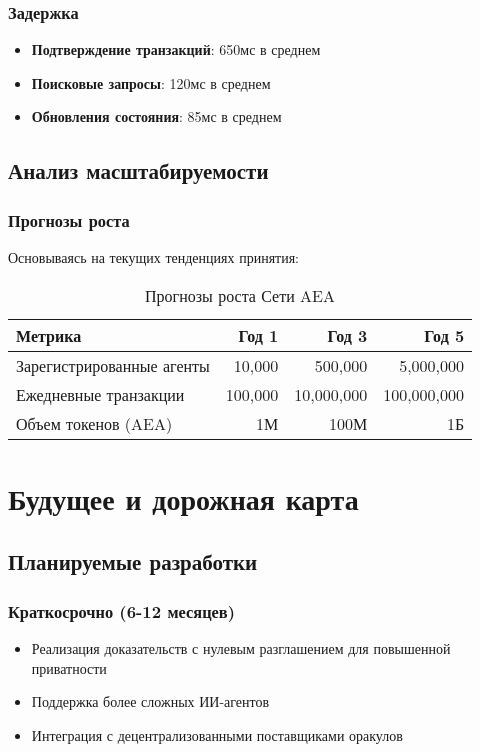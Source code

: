 \documentclass[12pt,a4paper]{article}
\begin{document}
\subsubsection{Задержка}

\begin{itemize}
\item \textbf{Подтверждение транзакций}: 650мс в среднем
\item \textbf{Поисковые запросы}: 120мс в среднем
\item \textbf{Обновления состояния}: 85мс в среднем
\end{itemize}

\subsection{Анализ масштабируемости}

\subsubsection{Прогнозы роста}

Основываясь на текущих тенденциях принятия:

\begin{table}[H]
\centering
\begin{tabular}{lrrr}
\toprule
\textbf{Метрика} & \textbf{Год 1} & \textbf{Год 3} & \textbf{Год 5} \\
\midrule
Зарегистрированные агенты & 10,000 & 500,000 & 5,000,000 \\
Ежедневные транзакции & 100,000 & 10,000,000 & 100,000,000 \\
Объем токенов (AEA) & 1М & 100М & 1Б \\
\bottomrule
\end{tabular}
\caption{Прогнозы роста Сети AEA}
\end{table}

\section{Будущее и дорожная карта}

\subsection{Планируемые разработки}

\subsubsection{Краткосрочно (6-12 месяцев)}
\begin{itemize}
\item Реализация доказательств с нулевым разглашением для повышенной приватности
\item Поддержка более сложных ИИ-агентов
\item Интеграция с децентрализованными поставщиками оракулов
\end{itemize}
\end{document}
